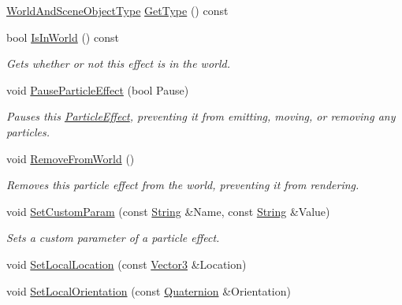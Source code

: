 \begin{DoxyCompactItemize}
\hyperlink{namespaceMezzanine_ae8cd04f706f4998be62f454b7119c718}{WorldAndSceneObjectType} \hyperlink{classMezzanine_1_1ParticleEffect_af0004d25fea2ac8a3ace7226193e9aaf}{GetType} () const 
\item 
bool \hyperlink{classMezzanine_1_1ParticleEffect_a6ad8b80cbe06d818a78dcff6e1069183}{IsInWorld} () const 
\begin{DoxyCompactList}\small\item\em Gets whether or not this effect is in the world. \item\end{DoxyCompactList}\item 
void \hyperlink{classMezzanine_1_1ParticleEffect_abafad46a7dc161b0974adaf0dc2e6433}{PauseParticleEffect} (bool Pause)
\begin{DoxyCompactList}\small\item\em Pauses this \hyperlink{classMezzanine_1_1ParticleEffect}{ParticleEffect}, preventing it from emitting, moving, or removing any particles. \item\end{DoxyCompactList}\item 
void \hyperlink{classMezzanine_1_1ParticleEffect_ac7786808910f8adcf08f2363a12ee6bd}{RemoveFromWorld} ()
\begin{DoxyCompactList}\small\item\em Removes this particle effect from the world, preventing it from rendering. \item\end{DoxyCompactList}\item 
void \hyperlink{classMezzanine_1_1ParticleEffect_a8e320ef29d8eafd48e818326b4bc43b9}{SetCustomParam} (const \hyperlink{namespaceMezzanine_acf9fcc130e6ebf08e3d8491aebcf1c86}{String} \&Name, const \hyperlink{namespaceMezzanine_acf9fcc130e6ebf08e3d8491aebcf1c86}{String} \&Value)
\begin{DoxyCompactList}\small\item\em Sets a custom parameter of a particle effect. \item\end{DoxyCompactList}\item 
void \hyperlink{classMezzanine_1_1ParticleEffect_a6840690a153731dd2a3699187b5af1a9}{SetLocalLocation} (const \hyperlink{classMezzanine_1_1Vector3}{Vector3} \&Location)
\item 
void \hyperlink{classMezzanine_1_1ParticleEffect_a2ab1695b2261bb058f64ed246a3bfc35}{SetLocalOrientation} (const \hyperlink{classMezzanine_1_1Quaternion}{Quaternion} \&Orientation)

\end{DoxyCompactItemize}
